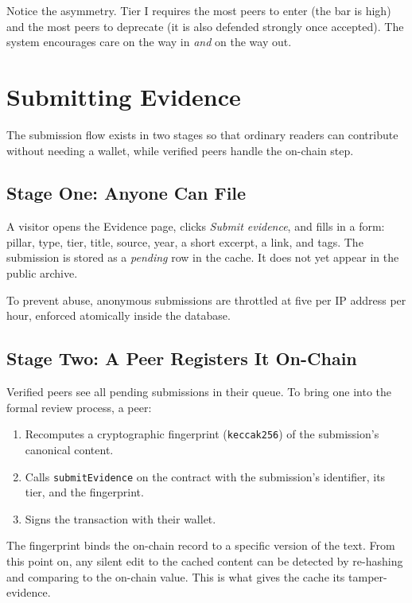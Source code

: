 \documentclass[11pt,a4paper]{article}
\begin{document}
Notice the asymmetry. Tier I requires the most peers to enter (the
bar is high) and the most peers to deprecate (it is also defended
strongly once accepted). The system encourages care on the way in
\emph{and} on the way out.

\section{Submitting Evidence}

The submission flow exists in two stages so that ordinary readers
can contribute without needing a wallet, while verified peers handle
the on-chain step.

\subsection{Stage One: Anyone Can File}

A visitor opens the Evidence page, clicks \emph{Submit evidence},
and fills in a form: pillar, type, tier, title, source, year, a
short excerpt, a link, and tags. The submission is stored as a
\emph{pending} row in the cache. It does not yet appear in the
public archive.

To prevent abuse, anonymous submissions are throttled at five per IP
address per hour, enforced atomically inside the database.

\subsection{Stage Two: A Peer Registers It On-Chain}

Verified peers see all pending submissions in their queue. To bring
one into the formal review process, a peer:

\begin{enumerate}[leftmargin=1.5em]
  \item Recomputes a cryptographic fingerprint
        (\texttt{keccak256}) of the submission's canonical content.
  \item Calls \texttt{submitEvidence} on the contract with the
        submission's identifier, its tier, and the fingerprint.
  \item Signs the transaction with their wallet.
\end{enumerate}

The fingerprint binds the on-chain record to a specific version of
the text. From this point on, any silent edit to the cached content
can be detected by re-hashing and comparing to the on-chain value.
This is what gives the cache its tamper-evidence.
\end{document}
